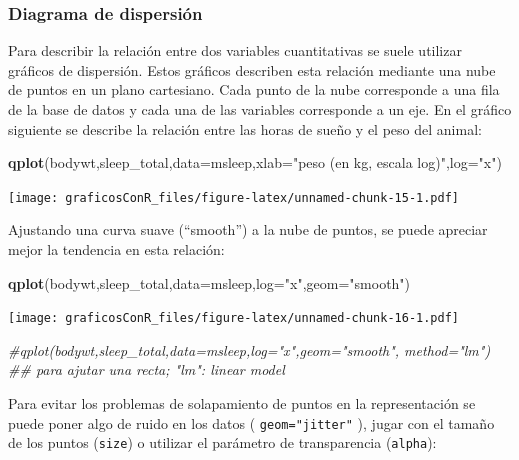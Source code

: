 \documentclass[]{article}
\newenvironment{Shaded}{\begin{snugshade}}{\end{snugshade}}
\newcommand{\CommentTok}[1]{\textcolor[rgb]{0.56,0.35,0.01}{\textit{#1}}}
\newcommand{\DataTypeTok}[1]{\textcolor[rgb]{0.13,0.29,0.53}{#1}}
\newcommand{\KeywordTok}[1]{\textcolor[rgb]{0.13,0.29,0.53}{\textbf{#1}}}
\newcommand{\NormalTok}[1]{#1}
\newcommand{\StringTok}[1]{\textcolor[rgb]{0.31,0.60,0.02}{#1}}
\numberwithin{ejcnt}{section}
\begin{document}
\hypertarget{diagrama-de-dispersion}{%
\subsubsection{Diagrama de dispersión}\label{diagrama-de-dispersion}}

Para describir la relación entre dos variables cuantitativas se suele utilizar gráficos de dispersión. Estos gráficos describen esta relación mediante una nube de puntos en un plano cartesiano. Cada punto de la nube corresponde a una fila de la base de datos y cada una de las variables corresponde a un eje.
En el gráfico siguiente se describe la relación entre las horas de sueño y el peso del animal:

\begin{Shaded}
\begin{Highlighting}[]
\KeywordTok{qplot}\NormalTok{(bodywt,sleep_total,}\DataTypeTok{data=}\NormalTok{msleep,}\DataTypeTok{xlab=}\StringTok{"peso (en kg, escala log)"}\NormalTok{,}\DataTypeTok{log=}\StringTok{"x"}\NormalTok{)}
\end{Highlighting}
\end{Shaded}

\texttt{[image: graficosConR\_files/figure-latex/unnamed-chunk-15-1.pdf]}

Ajustando una curva suave (``smooth'') a la nube de puntos, se puede apreciar mejor la tendencia en esta relación:

\begin{Shaded}
\begin{Highlighting}[]
\KeywordTok{qplot}\NormalTok{(bodywt,sleep_total,}\DataTypeTok{data=}\NormalTok{msleep,}\DataTypeTok{log=}\StringTok{"x"}\NormalTok{,}\DataTypeTok{geom=}\StringTok{"smooth"}\NormalTok{)}
\end{Highlighting}
\end{Shaded}

\texttt{[image: graficosConR\_files/figure-latex/unnamed-chunk-16-1.pdf]}

\begin{Shaded}
\begin{Highlighting}[]
\CommentTok{#qplot(bodywt,sleep_total,data=msleep,log="x",geom="smooth", method="lm") ## para ajutar una recta; "lm": linear model}
\end{Highlighting}
\end{Shaded}

Para evitar los problemas de solapamiento de puntos en la representación se puede poner algo de ruido en los datos ( \texttt{geom="jitter"} ), jugar con el tamaño de los puntos (\texttt{size}) o utilizar el parámetro de transparencia (\texttt{alpha}):
\end{document}
